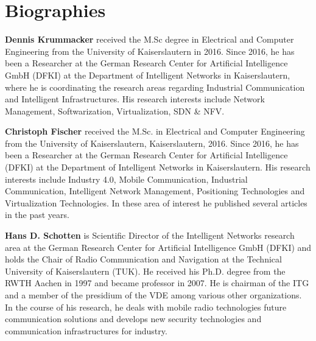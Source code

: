 \section*{Biographies}

\textbf{Dennis Krummacker}
received the M.Sc degree in Electrical and Computer Engineering from the University of Kaiserslautern in 2016. 
Since 2016, he has been a Researcher at the German Research Center for Artificial Intelligence GmbH (DFKI) at the Department of Intelligent Networks in Kaiserslautern, where he is coordinating the research areas regarding Industrial Communication and Intelligent Infrastructures.
His research interests include Network Management, Softwarization, Virtualization, SDN \& NFV.


\np%
\textbf{Christoph Fischer}
received the M.Sc. in Electrical and Computer Engineering from the University of Kaiserslautern, Kaiserslautern, 2016.
Since 2016, he has been a Researcher at the German Research Center for Artificial Intelligence (DFKI) at the Department of Intelligent Networks in Kaiserslautern.
His  research  interests  include Industry 4.0, Mobile Communication, Industrial Communication, Intelligent Network Management, Positioning Technologies and Virtualization Technologies.
In these area of interest he published several articles in the past years.


\np%
\textbf{Hans D. Schotten}
is Scientific Director of the Intelligent Networks research area at the German Research Center for Artificial Intelligence GmbH (DFKI) and holds the Chair of Radio Communication and Navigation at the Technical University of Kaiserslautern (TUK).
He received his Ph.D. degree from the RWTH Aachen in 1997 and became professor in 2007.
He is chairman of the ITG and a member of the presidium of the VDE among various other organizations.
In the course of his research, he deals with mobile radio technologies future communication solutions and develops new security technologies and communication infrastructures for industry.